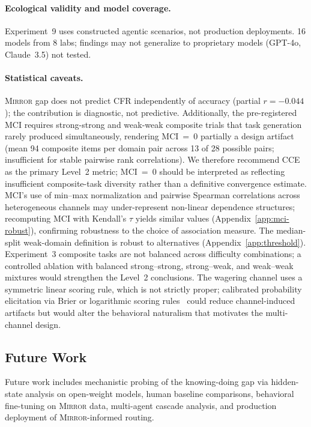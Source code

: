 \documentclass[10pt]{article}
\newcommand{\mirror}{\textsc{Mirror}}
\newcommand{\MCI}{MCI}
\newcommand{\CCE}{CCE}
\newcommand{\CFR}{CFR}
\begin{document}
\paragraph{Ecological validity and model coverage.}
Experiment~9 uses constructed agentic scenarios, not production deployments. 16 models from 8 labs; findings may not generalize to proprietary models (GPT-4o, Claude~3.5) not tested.

\paragraph{Statistical caveats.}
\mirror{} gap does not predict \CFR{} independently of accuracy (partial $r = -0.044$); the contribution is diagnostic, not predictive. Additionally, the pre-registered \MCI{} requires strong-strong and weak-weak composite trials that task generation rarely produced simultaneously, rendering \MCI{}~=~0 partially a design artifact (mean 94 composite items per domain pair across 13 of 28 possible pairs; insufficient for stable pairwise rank correlations). We therefore recommend \CCE{} as the primary Level~2 metric; \MCI{}~=~0 should be interpreted as reflecting insufficient composite-task diversity rather than a definitive convergence estimate.
MCI's use of min--max normalization and pairwise Spearman correlations across
heterogeneous channels may under-represent non-linear dependence structures;
recomputing MCI with Kendall's $\tau$ yields similar values (Appendix~\ref{app:mci-robust}), confirming robustness to the choice of association measure.
The median-split weak-domain definition is robust to alternatives (Appendix~\ref{app:threshold}).
Experiment~3 composite tasks are not balanced across difficulty combinations;
a controlled ablation with balanced strong--strong, strong--weak, and weak--weak
mixtures would strengthen the Level~2 conclusions.
The wagering channel uses a symmetric linear scoring rule, which is not strictly
proper; calibrated probability elicitation via Brier or logarithmic scoring
rules~\citep{gneiting2007strictly} could reduce channel-induced artifacts but
would alter the behavioral naturalism that motivates the multi-channel design.

\subsection{Future Work}

Future work includes mechanistic probing of the knowing-doing gap via hidden-state analysis on open-weight models, human baseline comparisons, behavioral fine-tuning on \mirror{} data, multi-agent cascade analysis, and production deployment of \mirror{}-informed routing.
\end{document}
